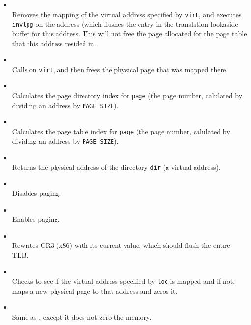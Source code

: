 \begin{itemize}
\item {} \\
Removes the mapping of the virtual address specified by \texttt{virt}, and
executes \texttt{invlpg} on the address (which flushes the entry in the
translation lookaside buffer for this address. This will not free the
page allocated for the page table that this address resided in.

\item {} \\
Calls  on \texttt{virt}, and then frees the
physical page that was mapped there.

\item {} \\
Calculates the page directory index for \texttt{page} (the page number, calulated
by dividing an address by \texttt{PAGE\_SIZE}).

\item {} \\
Calculates the page table index for \texttt{page} (the page number, calulated
by dividing an address by \texttt{PAGE\_SIZE}).

\item {} \\
Returns the physical address of the directory \texttt{dir} (a virtual address).

\item {} \\
Disables paging.

\item {} \\
Enables paging.

\item {} \\
Rewrites CR3 (x86) with its current value, which should flush the entire
TLB.

\item {} \\
Checks to see if the virtual address specified by \texttt{loc} is mapped
and if not, maps a new physical page to that address and zeros it.

\item {} \\
Same as , except it does not zero the memory.

\end{itemize}

